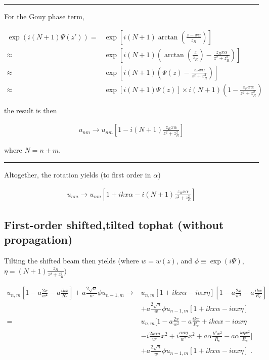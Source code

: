 \documentclass[aps,twoside,secnumarabic,balancelastpage,amsmath,amssymb,nofootinbib,hyperref=pdftex]{revtex4}
\begin{document}
\rule{\textwidth}{0.4pt}

For the Gouy phase term,

\begin{align*}
	\exp(i(N+1)\Psi(z' )) =&
	\exp[i(N+1)\arctan(\frac{z-x\alpha}{z_R})]
	\\ \approx &
	\exp[i(N+1) (
	\arctan(\frac{z}{z_R})
	-\frac{z_R x\alpha}{z^2 + z_R^2}
	)
	]
		\\ \approx &
	\exp[i(N+1)(
	\Psi(z) 
	-\frac{z_R x\alpha}{z^2 + z_R^2}
	)
	]
			\\ \approx &
	\exp[i(N+1)\Psi(z)] 
	\times i(N+1)
	(1 - \frac{z_R x\alpha}{z^2 + z_R^2})
\end{align*}

the result is then

\begin{align*}
	u_{nm} \rightarrow
	u_{nm}[1 - i(N+1)
	\frac{z_R x\alpha}{z^2 + z_R^2}]
\end{align*}

where $N=n+m$.

\rule{\textwidth}{0.4pt}

Altogether, the rotation yields (to first order in $\alpha$)

\begin{align*}
	u_{nm} \rightarrow
	u_{nm}[1 + ikx\alpha 
	- i(N+1)
	\frac{z_R x\alpha}{z^2 + z_R^2}]
\end{align*}

\subsection{First-order shifted,tilted tophat (without propagation)}

Tilting the shifted beam then yields (where $w=w(z)$, and $\phi \equiv \exp(i\Psi)$, $\eta = (N+1)
	\frac{z_R}{z^2 + z_R^2})$

\begin{align*}
	     u_{n,m}
     	 \left[
        1 - a\frac{2 x}{w^2}  
        - a \frac{ikx}{R_c}
    \right]
    + 
	a \frac{2 \sqrt{n}}{w} 
	\phi
	u_{n-1,m} \rightarrow&
	     u_{n,m}
	     [1
	     +ikx\alpha
	     - i\alpha x \eta
	     ]
     	 \left[
        1 - a\frac{2 x}{w^2}  
        - a \frac{ikx}{R_c}
    \right]
    \\ & + 
	a \frac{2 \sqrt{n}}{w} 
	\phi
	u_{n-1,m}
	[1+ikx\alpha - i\alpha x \eta]
	\\ = &
		     u_{n,m}
	     	\Big[
        1 - a\frac{2 x}{w^2}  
        - a \frac{ikx}{R_c} 
        + i k \alpha x 
        - i\alpha x \eta 
        \\ &       
        - i \frac{2 k \alpha a}{w^2} x^2
        + i \frac{\alpha a \eta }{w^2} x^2
        + a \alpha \frac{k^2x^2}{R_c}
        - a \alpha \frac{k \eta x^2}{R_c}
    \Big]
    \\& + 
	a \frac{2 \sqrt{n}}{w} 
	\phi
	u_{n-1,m}
	[1+ikx\alpha - i\alpha x \eta]
 \; .
\end{align*}
\end{document}
